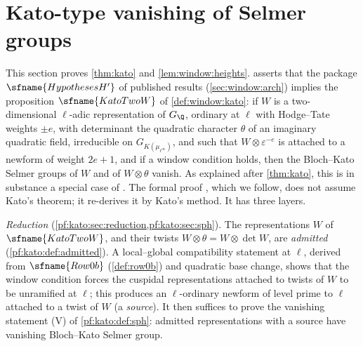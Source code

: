 \section{Kato-type vanishing of Selmer groups}\label{sec:pf:kato}

\providecommand{\katoQlb}{\overline{\Q}_\ell}
\providecommand{\katoHf}{H^1_{f}}
\providecommand{\katoO}{\mathcal{O}}
\providecommand{\katoZ}{Z^1}
\providecommand{\katoB}{B^1}
\providecommand{\katoht}{\mathrm{ht}}
\providecommand{\katoadj}{\operatorname{adj}}
\providecommand{\katoeq}[1]{\equiv_{#1}}
\providecommand{\katorep}[1]{[#1]}
\providecommand{\katoN}{\mathrm{N}}

This section proves \cref{thm:kato} and \cref{lem:window:heights}.  asserts that the
package $\sfname{HypothesesH'}$ of published results (\cref{sec:window:arch}) implies the proposition
$\sfname{KatoTwoW}$ of \cref{def:window:kato}: if $W$ is a two-dimensional $\ell$-adic representation of
$G_\Q$, ordinary at $\ell$ with Hodge--Tate weights $\pm e$, with determinant the quadratic character $\theta$
of an imaginary quadratic field, irreducible on $G_{K(\mu_{\ell^\infty})}$, and such that $W\otimes\varepsilon^{-e}$
is attached to a newform of weight $2e+1$, and if a window condition holds, then the Bloch--Kato Selmer groups
of $W$ and of $W\otimes\theta$ vanish. As explained after \cref{thm:kato}, this is in substance a special case
of \cite[Thm.~14.2]{Kato2004}. The formal proof \cite{LeanSource2026}, which we follow, does not assume Kato's
theorem; it re-derives it by Kato's method. It has three layers.

\emph{Reduction} (\cref{pf:kato:sec:reduction,pf:kato:sec:sph}). The representations $W$ of
$\sfname{KatoTwoW}$, and their twists $W\otimes\theta=W\otimes\det W$, are \emph{admitted}
(\cref{pf:kato:def:admitted}). A local--global compatibility statement at $\ell$, derived from
$\sfname{Row0b}$ (\cref{def:row0b}) and quadratic base change, shows that the window condition forces the
cuspidal representations attached to twists of $W$ to be unramified at $\ell$; this produces an
$\ell$-ordinary newform of level prime to $\ell$ attached to a twist of $W$ (a \emph{source}). It then
suffices to prove the vanishing statement \textup{(V)} of \cref{pf:kato:def:sph}: admitted representations with a
source have vanishing Bloch--Kato Selmer group.

